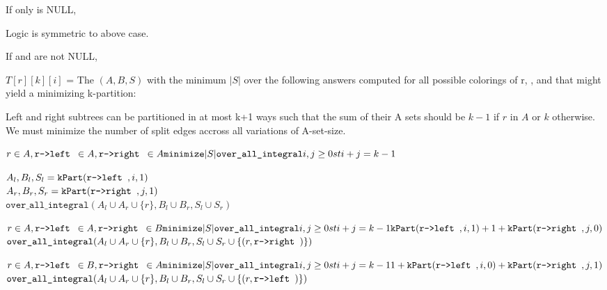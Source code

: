 \documentclass[11pt]{article}
\begin{document}
\begin{indentmore}
\begin{indentmore}
       \end{indentmore}
    If only \rright is NULL,\\
        \begin{indentmore}
        Logic is symmetric to above case.
        \end{indentmore}

    If \rleft and \rright are not NULL,\\
        \begin{indentmore}
        $T[r][k][i]$ = The $(A,B,S)$ with the minimum $|S|$ over the following answers computed for all possible colorings of r, \rright, and \rleft that might yield a minimizing k-partition:\\
                \begin{indentmore}
                Left and right subtrees can be partitioned in at most k+1 ways such that the sum of their A sets should be $k-1$ if $r$ in $A$ or $k$ otherwise.\\
                We must minimize the number of split edges accross all variations of A-set-size.
                \end{indentmore}

          $r \in A, \texttt{r->left } \in A, \texttt{r->right } \in A\\
              \texttt{minimize} |S| \texttt{over\_all\_integral} i,j \geq 0 st i+j = k-1$\\
                \begin{indentmore}
                $A_l, B_l, S_l = \mathtt{kPart}(\texttt{r->left },i,1)$\\
                $A_r, B_r, S_r = \mathtt{kPart}(\texttt{r->right },j,1)$\\
                $\texttt{over\_all\_integral} (A_l \cup A_r \cup \{r\},B_l \cup B_r,S_l \cup S_r)$
                \end{indentmore}

          $r \in A, \texttt{r->left } \in A, \texttt{r->right } \in B\\
              \texttt{minimize} |S| \texttt{over\_all\_integral} i,j \geq 0 st i+j = k-1\\
                    \mathtt{kPart}(\texttt{r->left },i,1) + 1 + \mathtt{kPart}(\texttt{r->right },j,0)$\\
                $\texttt{over\_all\_integral} (A_l \cup A_r \cup \{r\},B_l \cup B_r,S_l \cup S_r \cup \{(r, \texttt{r->right })\})$

          $r \in A, \texttt{r->left } \in B, \texttt{r->right } \in A\\
              \texttt{minimize} |S| \texttt{over\_all\_integral} i,j \geq 0 st i+j = k-1\\
                1 + \mathtt{kPart}(\texttt{r->left },i,0) +     \mathtt{kPart}(\texttt{r->right },j,1)$\\
                $\texttt{over\_all\_integral} (A_l \cup A_r \cup \{r\},B_l \cup B_r,S_l \cup S_r \cup \{(r, \texttt{r->left })\})$


\end{indentmore}
\end{indentmore}
\end{document}
